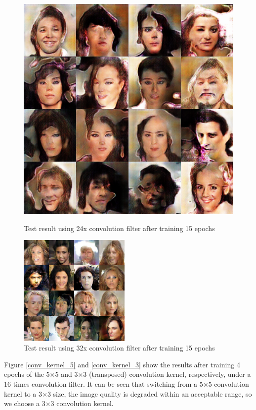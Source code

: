 \begin{figure}
\begin{minipage}[t]{0.48\linewidth}
        \includegraphics[width=\textwidth]{figures/result_conv_filter_24.png}
        \caption{Test result using 24x convolution filter after training 15 epochs}
        \label{conv_filter_24}
    \end{minipage}
    \begin{minipage}[t]{\linewidth}
        \centering
        \includegraphics[width=0.48\textwidth]{figures/result_conv_filter_32.png}
        \caption{Test result using 32x convolution filter after training 15 epochs}
        \label{conv_filter_32}
    \end{minipage}
\end{figure}

Figure \ref{conv_kernel_5} and \ref{conv_kernel_3} show the results after training 4 epochs of the 5×5 and 3×3 (transposed) convolution kernel,
    respectively, under a 16 times convolution filter.
It can be seen that switching from a 5×5 convolution kernel to a 3×3 size,
    the image quality is degraded within an acceptable range, so we choose a 3×3 convolution kernel.

